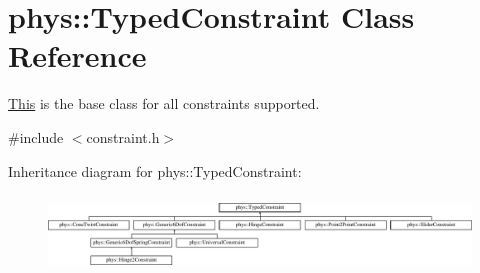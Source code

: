 \hypertarget{classphys_1_1TypedConstraint}{
\section{phys::TypedConstraint Class Reference}
\label{d1/d17/classphys_1_1TypedConstraint}
}


\hyperlink{structThis}{This} is the base class for all constraints supported.  




{\ttfamily \#include $<$constraint.h$>$}

Inheritance diagram for phys::TypedConstraint:\begin{figure}[H]
\begin{center}
\leavevmode
\includegraphics[height=2.04566cm]{d1/d17/classphys_1_1TypedConstraint}
\end{center}
\end{figure}
